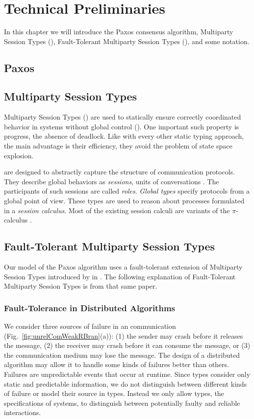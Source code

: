 \chapter{Technical Preliminaries}
In this chapter we will introduce the Paxos consensus algorithm, Multiparty Session Types (\MPST), Fault-Tolerant Multiparty Session Types (\FTMPST), and some notation.
\section{Paxos}

\section{Multiparty Session Types}
Multiparty Session Types (\MPST) are used to statically ensure correctly coordinated behavior in systems without global control (\cite{hondaYoshidaCarbone16,CoppoEtal15}).
One important such property is progress, \ie the absence of deadlock. Like with every other static typing approach, the main advantage is their efficiency, \ie they avoid the problem of state space explosion.

\MPST are designed to abstractly capture the structure of communication protocols.
They describe global behaviors as \emph{sessions}, \ie units of
conversations \cite{hondaYoshidaCarbone16,BettiniEtal08,BocciEtal10}. The participants of such sessions are called \emph{roles}.
\emph{Global types} specify protocols from a global point of view.
These types are used to reason about processes formulated
in a \emph{session calculus}. Most of the existing session calculi are
variants of the $ \pi $-calculus \cite{MilnerParrowWalker92}.

\section{Fault-Tolerant Multiparty Session Types}
Our model of the Paxos algorithm uses a fault-tolerant extension of Multiparty Session Types introduced by \citeauthor{PetersEtal21} in \cite{PetersEtal21}.
The following explanation of Fault-Tolerant Multiparty Session Types is from that same paper.

\subsection{Fault-Tolerance in Distributed Algorithms}
\label{sec:faultTol}
We consider three sources of failure in an \unrel communication (Fig.~\ref{fig:unrelComWeakRBran}(a)):
(1) the sender may crash before it releases the message,
(2) the receiver may crash before it can consume the message, or
(3) the communication medium may lose the message.
The design of a distributed algorithm may allow it to handle some kinds of failures better than others.
Failures are unpredictable events that occur at runtime.
Since types consider only static and predictable information, we do not distinguish between different kinds of failure or model their source in types.
Instead we only allow types, \ie the specifications of systems, to distinguish between potentially faulty and reliable interactions.

